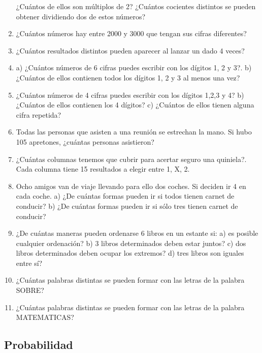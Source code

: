\begin{enumerate}
		\subitem ¿Cuántos de ellos son múltiplos de 2? 
		\subitem ¿Cuántos cocientes distintos se pueden obtener dividiendo dos de estos números?
	\item ¿Cuántos números hay entre 2000 y 3000 que tengan sus cifras diferentes?
	\item ¿Cuántos resultados distintos pueden aparecer al lanzar un dado 4 veces?
	\item a) ¿Cuántos números de 6 cifras puedes escribir con los dígitos 1, 2 y 3?. b) ¿Cuántos de ellos contienen todos los dígitos 1, 2 y 3 al menos una vez? 
	\item ¿Cuántos números de 4 cifras puedes escribir con los dígitos 1,2,3 y 4? b) ¿Cuántos de ellos contienen los 4 dígitos? c) ¿Cuántos de ellos tienen alguna cifra repetida?
	\item Todas las personas que asisten a una reunión se estrechan la mano. Si hubo 105 apretones, ¿cuántas personas asistieron?
	\item ¿Cuántas columnas tenemos que cubrir para acertar seguro una quiniela?. Cada columna tiene 15 resultados a elegir entre 1, X, 2. 
	\item Ocho amigos van de viaje llevando para ello dos coches. Si deciden ir 4 en cada coche.
		\subitem a) ¿De cuántas formas pueden ir si todos tienen carnet de conducir?
		\subitem b) ¿De cuántas formas pueden ir si sólo tres tienen carnet de conducir?
	\item  ¿De cuántas maneras pueden ordenarse 6 libros en un estante si:
		\subitem a) es posible cualquier ordenación?
		\subitem b) 3 libros determinados deben estar juntos?
		\subitem c) dos libros determinados deben ocupar los extremos?
		\subitem d) tres libros son iguales entre sí?
	\item ¿Cuántas palabras distintas se pueden formar con las letras de la palabra SOBRE?
	\item ¿Cuántas palabras distintas se pueden formar con las letras de la palabra MATEMATICAS?
\end{enumerate}

\subsection{Probabilidad}

